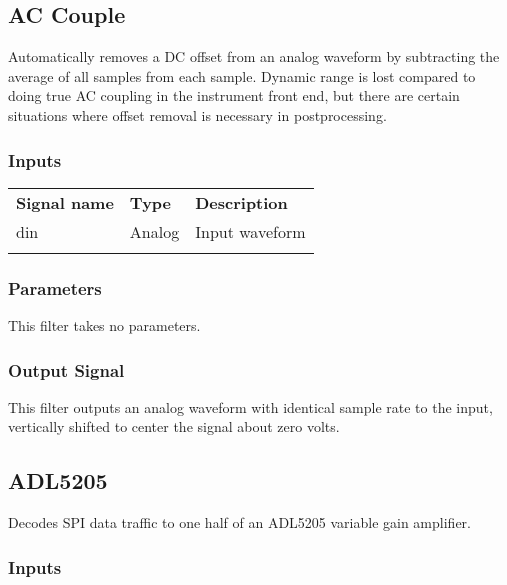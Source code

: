 \pagebreak
\subsection{AC Couple}

Automatically removes a DC offset from an analog waveform by subtracting the average of all samples from each sample.
Dynamic range is lost compared to doing true AC coupling in the instrument front end, but there are certain situations
where offset removal is necessary in postprocessing.

\subsubsection{Inputs}

\begin{tabularx}{16cm}{llX}
\thickhline
\textbf{Signal name} & \textbf{Type} & \textbf{Description} \\
\thickhline
din & Analog & Input waveform \\
\thickhline
\end{tabularx}

\subsubsection{Parameters}

This filter takes no parameters.

\subsubsection{Output Signal}

This filter outputs an analog waveform with identical sample rate to the input, vertically shifted to center the signal
about zero volts.

\pagebreak
\subsection{ADL5205}

Decodes SPI data traffic to one half of an ADL5205 variable gain amplifier.

\subsubsection{Inputs}

